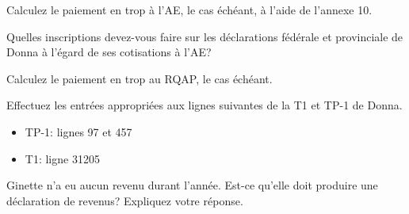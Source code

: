 \begin{question}
	Calculez le paiement en trop à l'AE, le cas échéant, à l'aide de l'annexe 10.
\end{question}

\begin{question}
	Quelles inscriptions devez-vous faire sur les déclarations fédérale et provinciale de Donna à l'égard de ses cotisations à l'AE?
\end{question}

\begin{question}
	Calculez le paiement en trop au RQAP, le cas échéant.
\end{question}

\begin{question}
	Effectuez les entrées appropriées aux lignes suivantes de la T1 et TP-1 de Donna.
	\begin{itemize}
		\item TP-1: lignes 97 et 457
		\item T1: ligne 31205
	\end{itemize}
\end{question}

\begin{question}
	Ginette n'a eu aucun revenu durant l'année. Est-ce qu'elle doit produire une déclaration de revenus? Expliquez votre réponse.
\end{question}
